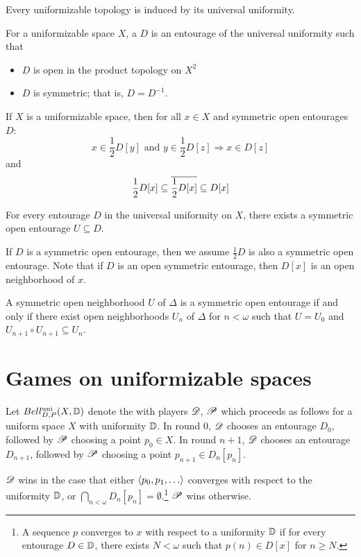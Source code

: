 \begin{thm}
  Every uniformizable topology is induced by its universal uniformity.
\end{thm}

\begin{defn}
  For a uniformizable space $X$, a  $D$ is an
  entourage of the universal uniformity such that
  \begin{itemize}
    \item $D$ is open in the product topology on $X^2$
    \item $D$ is symmetric; that is, $D=D^{-1}$.
  \end{itemize}
\end{defn}

\begin{prop}
  If $X$ is a uniformizable space, then for all $x\in X$ and symmetric open
  entourages $D$:
    \[
      x\in \frac{1}{2}D[y]\text{ and } y\in\frac{1}{2}D[z] \Rightarrow x\in D[z]
    \]
  and
    \[
      \frac{1}{2}D[x]\subseteq \overline{\frac{1}{2}D[x]}\subseteq D[x]
    \]
\end{prop}

\begin{thm}
  For every entourage $D$ in the universal uniformity on $X$, there exists a
  symmetric open entourage $U\subseteq D$.
\end{thm}

If $D$ is a symmetric open entourage, then we assume $\frac{1}{2}D$ is
also a symmetric open entourage. Note that if $D$ is an open symmetric
entourage, then $D[x]$ is an open neighborhood of $x$.

\begin{thm}
  A symmetric open neighborhood $U$ of $\Delta$ is a symmetric open entourage
  if and only if there exist open neighborhoods $U_n$ of $\Delta$ for $n<\omega$
  such that $U=U_0$ and $U_{n+1}\circ U_{n+1}\subseteq U_n$.
\end{thm}



\section{Games on uniformizable spaces}

\begin{game}
  Let $Bell_{D,P}^{\textrm{uni}}(X, \mathbb{D})$ denote the  with
  players $\mathscr{D}$, $\mathscr{P}$ which
  proceeds as follows for a uniform space $X$ with uniformity $\mathbb{D}$. In round
  $0$, $\mathscr{D}$ chooses an entourage $D_0$, followed by $\mathscr{P}$ choosing a point
  $p_0\in X$. In round $n+1$, $\mathscr{D}$ chooses an entourage $D_{n+1}$, followed
  by $\mathscr{P}$ choosing a point $p_{n+1}\in D_n[p_n]$.

  $\mathscr{D}$ wins in the case that either $\<p_0,p_1,\dots\>$ converges
  with respect to the uniformity $\mathbb{D}$,
  or $\bigcap_{n<\omega}D_n[p_n] = \emptyset$.\footnote{
    A sequence $p$ converges to $x$ with respect to a uniformity $\mathbb{D}$
    if for every entourage $D\in\mathbb{D}$, there exists $N<\omega$ such that
    $p(n)\in D[x]$ for $n\geq N$.
  } $\mathscr{P}$ wins otherwise.
\end{game}

